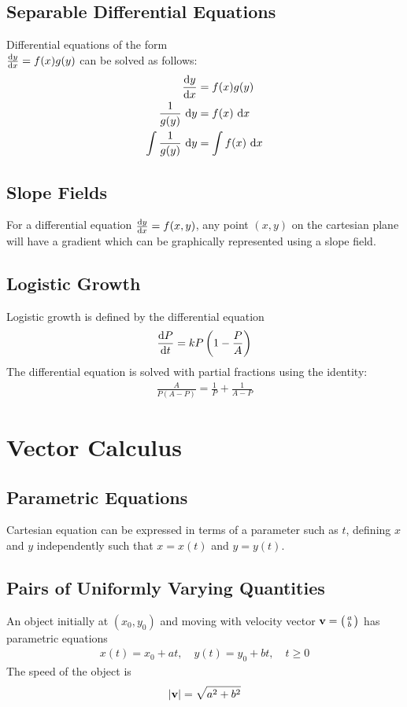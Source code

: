 \documentclass[10pt, a4paper, titlepage]{article}
\begin{document}
\begin{multicols*}{3}
	\dotfill
	\subsection{Separable Differential Equations}
	Differential equations of the form \\$\dv{y}{x}=f(x)g(y)$ can be solved as follows:
	\begin{align}
		\dv{y}{x}&=f(x)g(y)\\
		\frac{1}{g(y)}\, \dd{y}&=f(x)\, \dd{x}\\
		\int \frac{1}{g(y)}\, \dd{y}&=\int f(x)\, \dd{x}
	\end{align}

	\dotfill
	\subsection{Slope Fields}
	For a differential equation $\dv{y}{x}=f(x,y)$, any point $(x,y)$ on the cartesian plane will have a gradient which can be graphically represented using a slope field.

	\dotfill
	\subsection{Logistic Growth}
	Logistic growth is defined by the differential equation
	\begin{align}
		\dv{P}{t}=kP\left(1-\frac{P}{A}\right)
	\end{align}
	The differential equation is solved with partial fractions using the identity:
	\begin{align}
		\frac{A}{P(A-P)}=\frac{1}{P}+\frac{1}{A-P}
	\end{align}
	
	\hrulefill

	\section{Vector Calculus}
	\subsection{Parametric Equations}
	Cartesian equation can be expressed in terms of a parameter such as $t$, defining $x$ and $y$ independently such that $x=x(t)$ and $y=y(t)$.

	\dotfill
	\subsection{Pairs of Uniformly Varying Quantities}
	An object initially at $(x_0,y_0)$ and moving with velocity vector $\vb{v}=\big(\begin{smallmatrix}a \\b \end{smallmatrix}\big)$ has parametric equations
	\begin{align}
		x(t)=x_0+at,\quad y(t)=y_0+bt,\quad t\geq 0
	\end{align}
	The speed of the object is
	\begin{align}
		|\vb{v}|=\sqrt{a^2+b^2}
	\end{align}


\end{multicols*}
\end{document}
